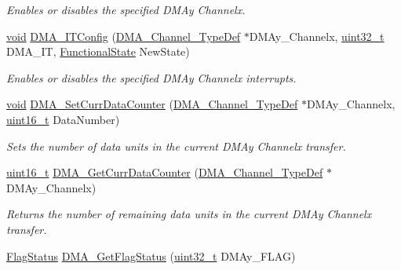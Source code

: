 \begin{DoxyCompactItemize}
\begin{DoxyCompactList}\small\item\em Enables or disables the specified D\+M\+Ay Channelx. \end{DoxyCompactList}\item 
\hyperlink{usb__devapi_8h_afabf60e7f57651d6d595a02c75f07cd0}{void} \hyperlink{group___d_m_a___private___functions_ga0bb60360be9cd57f96399be2f3b5eb2b}{D\+M\+A\+\_\+\+I\+T\+Config} (\hyperlink{struct_d_m_a___channel___type_def}{D\+M\+A\+\_\+\+Channel\+\_\+\+Type\+Def} $\ast$D\+M\+Ay\+\_\+\+Channelx, \hyperlink{_p_e___types_8h_a33594304e786b158f3fb30289278f5af}{uint32\+\_\+t} D\+M\+A\+\_\+\+IT, \hyperlink{agilefox_2library_2inc_2stm32f10x__type_8h_ac9a7e9a35d2513ec15c3b537aaa4fba1}{Functional\+State} New\+State)
\begin{DoxyCompactList}\small\item\em Enables or disables the specified D\+M\+Ay Channelx interrupts. \end{DoxyCompactList}\item 
\hyperlink{usb__devapi_8h_afabf60e7f57651d6d595a02c75f07cd0}{void} \hyperlink{group___d_m_a___private___functions_gade5d9e532814eaa46514cb385fdff709}{D\+M\+A\+\_\+\+Set\+Curr\+Data\+Counter} (\hyperlink{struct_d_m_a___channel___type_def}{D\+M\+A\+\_\+\+Channel\+\_\+\+Type\+Def} $\ast$D\+M\+Ay\+\_\+\+Channelx, \hyperlink{_p_e___types_8h_a1f1825b69244eb3ad2c7165ddc99c956}{uint16\+\_\+t} Data\+Number)
\begin{DoxyCompactList}\small\item\em Sets the number of data units in the current D\+M\+Ay Channelx transfer. \end{DoxyCompactList}\item 
\hyperlink{_p_e___types_8h_a1f1825b69244eb3ad2c7165ddc99c956}{uint16\+\_\+t} \hyperlink{group___d_m_a___private___functions_ga511b4c402d1ff32d53f28736956cac5d}{D\+M\+A\+\_\+\+Get\+Curr\+Data\+Counter} (\hyperlink{struct_d_m_a___channel___type_def}{D\+M\+A\+\_\+\+Channel\+\_\+\+Type\+Def} $\ast$D\+M\+Ay\+\_\+\+Channelx)
\begin{DoxyCompactList}\small\item\em Returns the number of remaining data units in the current D\+M\+Ay Channelx transfer. \end{DoxyCompactList}\item 
\hyperlink{agilefox_2library_2inc_2stm32f10x__type_8h_a89136caac2e14c55151f527ac02daaff}{Flag\+Status} \hyperlink{group___d_m_a___private___functions_gafb30b7a891834c267eefd5d30b688a9f}{D\+M\+A\+\_\+\+Get\+Flag\+Status} (\hyperlink{_p_e___types_8h_a33594304e786b158f3fb30289278f5af}{uint32\+\_\+t} D\+M\+Ay\+\_\+\+F\+L\+AG)

\end{DoxyCompactItemize}
